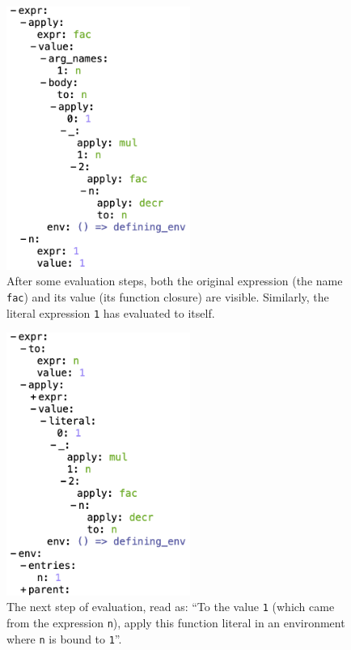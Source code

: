 \documentclass[ twoside,openright,titlepage,numbers=noenddot,headinclude,footinclude,cleardoublepage=empty,abstract=on,
                BCOR=5mm,paper=a4,fontsize=11pt
                ]{scrreprt}
\theoremstyle{definition}
\begin{document}
\begin{figure}
\centering
\includegraphics[width=6cm]{masp/2-eval-fac-n.png}
\caption[Masp Factorial evaluation step 2]{After some evaluation steps, both the original expression (the name \texttt{fac}) and its value (its function closure) are visible. Similarly, the literal expression \texttt{1} has evaluated to itself.}
\label{fig:masp-2}
\end{figure}

\begin{figure}
\centering
\includegraphics[width=6cm]{masp/3-expand-fac.png}
\caption[Masp Factorial evaluation step 3]{The next step of evaluation, read as: ``To the value \texttt{1} (which came from the expression \texttt{n}), apply this function literal in an environment where \texttt{n} is bound to \texttt{1}''.}
\label{fig:masp-3}
\end{figure}
\end{document}
